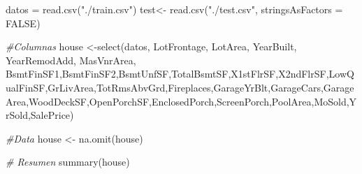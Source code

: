 \documentclass[
]{article}
\newenvironment{Shaded}{\begin{snugshade}}{\end{snugshade}}
\newcommand{\AttributeTok}[1]{\textcolor[rgb]{0.77,0.63,0.00}{#1}}
\newcommand{\CommentTok}[1]{\textcolor[rgb]{0.56,0.35,0.01}{\textit{#1}}}
\newcommand{\ConstantTok}[1]{\textcolor[rgb]{0.00,0.00,0.00}{#1}}
\newcommand{\FunctionTok}[1]{\textcolor[rgb]{0.00,0.00,0.00}{#1}}
\newcommand{\NormalTok}[1]{#1}
\newcommand{\OtherTok}[1]{\textcolor[rgb]{0.56,0.35,0.01}{#1}}
\newcommand{\StringTok}[1]{\textcolor[rgb]{0.31,0.60,0.02}{#1}}
\begin{document}
\begin{Shaded}
\begin{Highlighting}[]
\NormalTok{datos }\OtherTok{=} \FunctionTok{read.csv}\NormalTok{(}\StringTok{"./train.csv"}\NormalTok{)}
\NormalTok{test}\OtherTok{\textless{}{-}} \FunctionTok{read.csv}\NormalTok{(}\StringTok{"./test.csv"}\NormalTok{, }\AttributeTok{stringsAsFactors =} \ConstantTok{FALSE}\NormalTok{)}

\CommentTok{\#Columnas}
\NormalTok{house }\OtherTok{\textless{}{-}}\FunctionTok{select}\NormalTok{(datos, LotFrontage, LotArea, YearBuilt, YearRemodAdd, MasVnrArea, BsmtFinSF1,BsmtFinSF2,BsmtUnfSF,TotalBsmtSF,X1stFlrSF,X2ndFlrSF,LowQualFinSF,GrLivArea,TotRmsAbvGrd,Fireplaces,GarageYrBlt,GarageCars,GarageArea,WoodDeckSF,OpenPorchSF,EnclosedPorch,ScreenPorch,PoolArea,MoSold,YrSold,SalePrice)}

\CommentTok{\#Data}
\NormalTok{house }\OtherTok{\textless{}{-}} \FunctionTok{na.omit}\NormalTok{(house)}

\CommentTok{\# Resumen }
\FunctionTok{summary}\NormalTok{(house)}
\end{Highlighting}
\end{Shaded}
\end{document}
